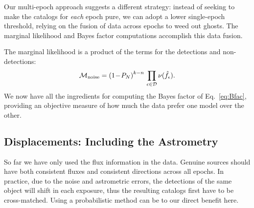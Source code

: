 \documentclass[twocolumn]{emulateapj}
\newcommand{\eind}{\epsilon}  %
\newcommand{\mlike}{\mathcal{M}}  %
\newcommand{\flux}{f}
\newcommand{\fest}{\hat{\flux}}  %
\newcommand{\dtxn}{\mathcal{D}}  %
\newcommand{\npd}{\nu}  %
\begin{document}

Our multi-epoch approach suggests a different strategy: instead of seeking to make the catalogs for \emph{each} epoch pure, we can adopt a lower single-epoch threshold, relying on the fusion of data across epochs to weed out ghosts.
The marginal likelihood and Bayes factor computations accomplish this data fusion.

The marginal likelihood is a product of the terms for the detections and non-detections:
%
\begin{equation}
\mlike_{\rm noise} = \left(1\!-\!P_N\right)^{k-n}\,\prod_{\eind \in \dtxn} \npd(\fest_\eind).
\end{equation}
%
We now have all the ingredients for computing the Bayes factor of Eq.~\ref{eq:Bfac}, providing an objective measure of how much the data prefer one model over the other. 


\subsection{Displacements: Including the Astrometry}
\label{sec:astrom}
\noindent
So far we have only used the flux information in the data. 
Genuine sources should have both consistent fluxes and consistent directions across all epochs.
In practice, due to the noise and astrometric errors, the detections of the same object will shift in each exposure, thus the resulting catalogs first have to be cross-matched. 
Using a probabilistic method can be to our direct benefit here.
\end{document}

